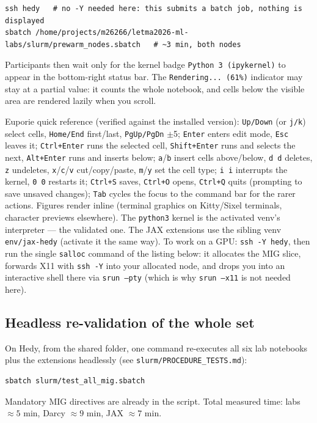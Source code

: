 \documentclass[11pt,a4paper]{article}
\begin{document}
\begin{lstlisting}
ssh hedy   # no -Y needed here: this submits a batch job, nothing is displayed
sbatch /home/projects/m26266/letma2026-ml-labs/slurm/prewarm_nodes.sbatch   # ~3 min, both nodes
\end{lstlisting}

Participants then wait only for the kernel badge \texttt{Python 3 (ipykernel)} to appear
in the bottom-right status bar. The \texttt{Rendering... (61\%)} indicator may stay at a
partial value: it counts the whole notebook, and cells below the visible area are rendered
lazily when you scroll.

Euporie quick reference (verified against the installed version): \texttt{Up/Down} (or
\texttt{j/k}) select cells, \texttt{Home/End} first/last, \texttt{PgUp/PgDn} $\pm$5;
\texttt{Enter} enters edit mode, \texttt{Esc} leaves it; \texttt{Ctrl+Enter} runs the selected
cell, \texttt{Shift+Enter} runs and selects the next, \texttt{Alt+Enter} runs and inserts below;
\texttt{a}/\texttt{b} insert cells above/below, \texttt{d d} deletes, \texttt{z} undeletes,
\texttt{x}/\texttt{c}/\texttt{v} cut/copy/paste, \texttt{m}/\texttt{y} set the cell type;
\texttt{i i} interrupts the kernel, \texttt{0 0} restarts it; \texttt{Ctrl+S} saves,
\texttt{Ctrl+O} opens, \texttt{Ctrl+Q} quits (prompting to save unsaved changes); \texttt{Tab}
cycles the focus to the command bar for the rarer actions. Figures render inline (terminal
graphics on Kitty/Sixel terminals, character previews elsewhere). The \texttt{python3} kernel
is the activated venv's interpreter --- the validated one. The JAX extensions use the sibling
venv \texttt{env/jax-hedy} (activate it the same way). To work on a GPU: \texttt{ssh -Y hedy},
then run the single \texttt{salloc} command of the listing below: it allocates the
MIG slice, forwards X11 with \texttt{ssh -Y} into your allocated node, and drops you
into an interactive shell there via \texttt{srun --pty} (which is why
\texttt{srun --x11} is not needed here).

\subsection*{Headless re-validation of the whole set}
On Hedy, from the shared folder, one command re-executes all six lab notebooks plus the
extensions headlessly (see \texttt{slurm/PROCEDURE\_TESTS.md}):
\begin{lstlisting}
sbatch slurm/test_all_mig.sbatch
\end{lstlisting}
Mandatory MIG directives are already in the script. Total measured time: labs
$\approx 5$ min, Darcy $\approx 9$ min, JAX $\approx 7$ min.
\end{document}
